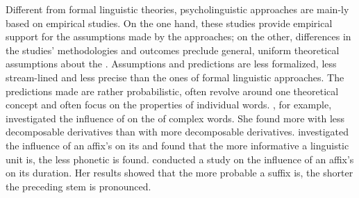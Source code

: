 Different from formal linguistic theories, psycholinguistic approaches are main-ly based on empirical studies. On the one hand, these studies provide empirical support for the assumptions made by the approaches; on the other, differences in the studies' methodologies and outcomes preclude general, uniform theoretical assumptions about the . Assumptions and predictions are less formalized, less stream-lined and less precise than the ones of formal linguistic approaches. The predictions made are rather probabilistic, often revolve around one theoretical concept and often focus on the properties of individual words. 
 \cite{Hay.2001,Hay.2003}, for example, investigated the influence of  on the  of complex words.  She found more  with less decomposable derivatives than with more decomposable derivatives. 
\cite{Pluymaekers.2010} investigated the influence of an affix's  on its  and found that the more informative a linguistic unit is, the less phonetic  is found. 
\cite{Cohen.2014} conducted a study on the influence of an affix's  on its duration. Her results showed that the more probable a suffix is, the shorter the preceding stem is pronounced.

